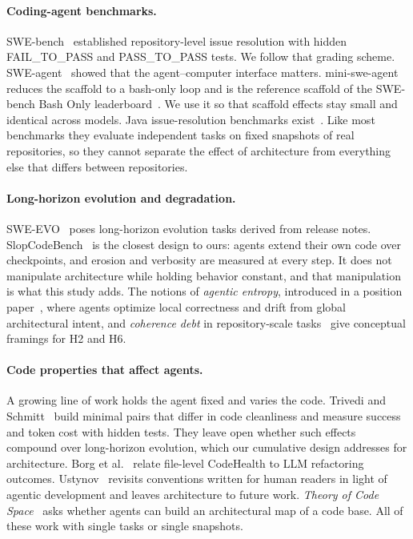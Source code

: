 \documentclass[10pt]{article}
\begin{document}
\paragraph{Coding-agent benchmarks.} SWE-bench~\citep{jimenez2024swebench} established
repository-level issue resolution with hidden FAIL\_TO\_PASS and PASS\_TO\_PASS tests. We follow
that grading scheme. SWE-agent~\citep{yang2024sweagent} showed that the agent--computer interface
matters. mini-swe-agent~\citep{minisweagent} reduces the scaffold to a bash-only loop and is the
reference scaffold of the SWE-bench Bash Only leaderboard~\citep{swebenchbashonly}. We use it so
that scaffold effects stay small and identical across models. Java issue-resolution benchmarks
exist~\citep{zan2024swebenchjava,zan2025multiswebench}. Like most benchmarks they evaluate
independent tasks on fixed snapshots of real repositories, so they cannot separate the effect of
architecture from everything else that differs between repositories.

\paragraph{Long-horizon evolution and degradation.} SWE-EVO~\citep{sweevo2025} poses
long-horizon evolution tasks derived from release notes. SlopCodeBench~\citep{slopcodebench2026}
is the closest design to ours: agents extend their own code over checkpoints, and erosion and
verbosity are measured at every step. It does not manipulate architecture while holding behavior
constant, and that manipulation is what this study adds. The notions of \emph{agentic
entropy}, introduced in a position paper~\citep{agenticentropy2026}, where agents optimize local correctness and drift from global
architectural intent, and \emph{coherence debt} in repository-scale tasks~\citep{coherencedebt2026}
give conceptual framings for H2 and H6.

\paragraph{Code properties that affect agents.} A growing line of work holds the agent fixed and
varies the code. Trivedi and Schmitt~\citep{trivedi2026cleanliness} build minimal pairs that
differ in code cleanliness and measure success and token cost with hidden tests. They leave open
whether such effects compound over long-horizon evolution, which our cumulative design addresses
for architecture. Borg et al.~\citep{borg2026codehealth} relate file-level CodeHealth to
LLM refactoring outcomes. Ustynov~\citep{ustynov2026beyond} revisits conventions written for human
readers in light of agentic development and leaves architecture to future work. \emph{Theory of Code Space}~\citep{sapunov2026tocs}
asks whether agents can build an architectural map of a code base. All of these work with single tasks or single snapshots.
\end{document}
